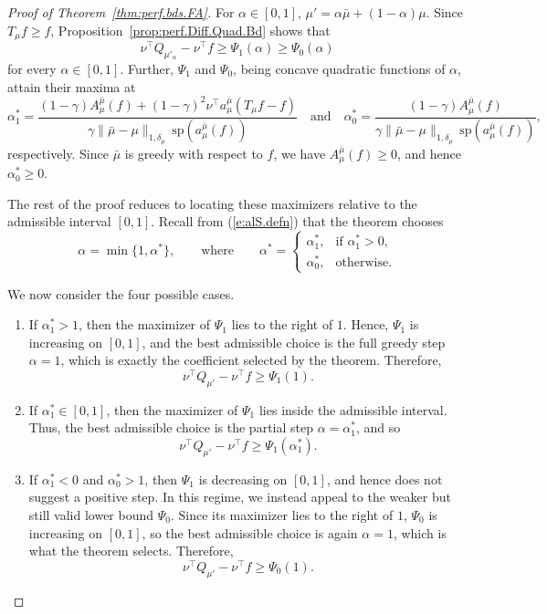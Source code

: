 \documentclass[twoside]{article}
\theoremstyle{plain}
\theoremstyle{definition}
\theoremstyle{remark}
\renewcommand{\sp}{\mathrm{sp}}
\newcommand{\tr}{\top}
\newcommand{\mup}{\mu'}
\newcommand{\mub}{\bar{\mu}}
\newcommand{\alS}{\alpha^*}
\renewcommand{\eqref}[1]{(\ref{#1})}
\begin{document}
\begin{proof}[Proof of Theorem~\ref{thm:perf.bds.FA}]
For \(\alpha\in[0,1]\), $\mup = \alpha \mub + (1-\alpha)\mu.$ Since \(T_\mu f \ge f\), Proposition~\ref{prop:perf.Diff.Quad.Bd} shows that
\[
    \nu^\tr Q_{\mup_\alpha} - \nu^\tr f \ge \Psi_1(\alpha) \ge \Psi_0(\alpha)
\]
%
for every \(\alpha\in[0,1]\). Further, \(\Psi_1\) and \(\Psi_0\), being concave quadratic functions of \(\alpha\), attain their maxima at
\[
    \alS_1
    =
    \frac{
        (1 - \gamma) A_{\mu}^{\mub}(f)
        +
        (1 - \gamma)^2 \nu^\tr a_{\mu}^{\mub}(T_{\mu}f - f)
    }{
        \gamma \|\mub - \mu\|_{1, \delta_{\mu}}\, \sp(a_{\mu}^{\mub}(f))
    }
    \quad \text{and} \quad
    \alS_0
    =
    \frac{
        (1 - \gamma) A_{\mu}^{\mub}(f)
    }{
        \gamma \|\mub - \mu\|_{1, \delta_{\mu}}\, \sp(a_{\mu}^{\mub}(f))
    },
\]
respectively. Since \(\mub\) is greedy with respect to \(f\), we have \(A_{\mu}^{\mub}(f)\ge 0\), and hence \(\alS_0 \ge 0\).

The rest of the proof reduces to locating these maximizers relative to the admissible interval \([0,1]\). Recall from \eqref{e:alS.defn} that the theorem chooses
\[
    \alpha = \min\{1,\alS\},
    \qquad\text{where}\qquad
    \alS =
    \begin{cases}
        \alS_1, & \text{if } \alS_1 > 0,\\
        \alS_0, & \text{otherwise.}
    \end{cases}
\]

We now consider the four possible cases.

\begin{enumerate}
    \item If \(\alS_1 > 1\), then the maximizer of \(\Psi_1\) lies to the right of \(1\). Hence, \(\Psi_1\) is increasing on \([0,1]\), and the best admissible choice is the full greedy step \(\alpha=1\), which is exactly the coefficient selected by the theorem. Therefore,
    \[
        \nu^\tr Q_{\mup} - \nu^\tr f \ge \Psi_1(1).
    \]

    \item If \(\alS_1 \in [0,1]\), then the maximizer of \(\Psi_1\) lies inside the admissible interval. Thus, the best admissible choice is the partial step \(\alpha=\alS_1\), and so
    \[
        \nu^\tr Q_{\mup} - \nu^\tr f \ge \Psi_1(\alS_1).
    \]

    \item If \(\alS_1 < 0\) and \(\alS_0 > 1\), then \(\Psi_1\) is decreasing on \([0,1]\), and hence does not suggest a positive step. In this regime, we instead appeal to the weaker but still valid lower bound \(\Psi_0\). Since its maximizer lies to the right of \(1\), \(\Psi_0\) is increasing on \([0,1]\), so the best admissible choice is again \(\alpha=1\), which is what the theorem selects. Therefore,
    \[
        \nu^\tr Q_{\mup} - \nu^\tr f \ge \Psi_0(1).
    \]


\end{enumerate}
\end{proof}
\end{document}
